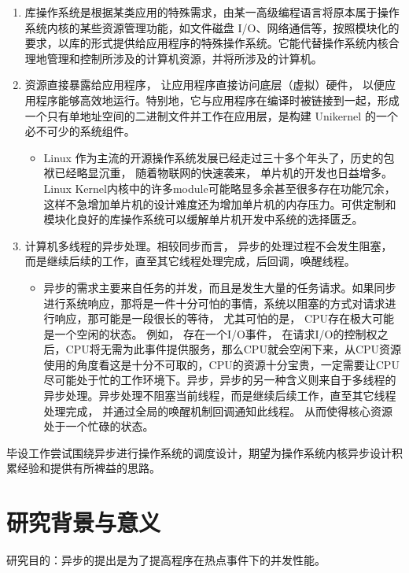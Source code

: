 \begin{enumerate}
\item 库操作系统是根据某类应用的特殊需求，由某一高级编程语言将原本属于操作系统内核的某些资源管理功能，如文件磁盘 I/O、网络通信等，按照模块化的要求，以库的形式提供给应用程序的特殊操作系统。它能代替操作系统内核合理地管理和控制所涉及的计算机资源，并将所涉及的计算机。
\item 资源直接暴露给应用程序， 让应用程序直接访问底层（虚拟）硬件， 以便应用程序能够高效地运行。特别地，它与应用程序在编译时被链接到一起，形成一个只有单地址空间的二进制文件并工作在应用层，是构建 Unikernel 的一个必不可少的系统组件。
    \begin{itemize}
        \item Linux 作为主流的开源操作系统发展已经走过三十多个年头了，历史的包袱已经略显沉重， 随着物联网的快速袭来， 单片机的开发也日益增多。 Linux Kernel内核中的许多module可能略显多余甚至很多存在功能冗余， 这样不急增加单片机的设计难度还为增加单片机的内存压力。可供定制和模块化良好的库操作系统可以缓解单片机开发中系统的选择匮乏。
    \end{itemize}
\item 计算机多线程的异步处理。相较同步而言， 异步的处理过程不会发生阻塞，而是继续后续的工作，直至其它线程处理完成，后回调，唤醒线程。
    \begin{itemize}
    \item 异步的需求主要来自任务的并发，而且是发生大量的任务请求。如果同步进行系统响应，那将是一件十分可怕的事情，系统以阻塞的方式对请求进行响应，那可能是一段很长的等待， 尤其可怕的是， CPU存在极大可能是一个空闲的状态。 例如， 存在一个I/O事件， 在请求I/O的控制权之后，CPU将无需为此事件提供服务，那么CPU就会空闲下来，从CPU资源使用的角度看这是十分不可取的，CPU的资源十分宝贵，一定需要让CPU尽可能处于忙的工作环境下。异步，异步的另一种含义则来自于多线程的异步处理。异步处理不阻塞当前线程，而是继续后续工作，直至其它线程处理完成， 并通过全局的唤醒机制回调通知此线程。 从而使得核心资源处于一个忙碌的状态。
    \end{itemize}
\end{enumerate}

毕设工作尝试围绕异步进行操作系统的调度设计，期望为操作系统内核异步设计积累经验和提供有所裨益的思路。

\section{研究背景与意义}

研究目的：异步的提出是为了提高程序在热点事件下的并发性能。

